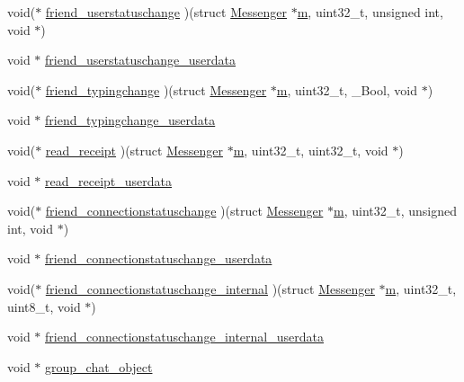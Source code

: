 \begin{DoxyCompactItemize}
\item 
void($\ast$ \hyperlink{struct_messenger_a61d62ee2f1f496b742acdcdf2c02f388}{friend\+\_\+userstatuschange} )(struct \hyperlink{struct_messenger}{Messenger} $\ast$\hyperlink{_messenger__test_8c_aea6eb6c7c30a659f1b0dee83eaf03ea2}{m}, uint32\+\_\+t, unsigned int, void $\ast$)
\item 
void $\ast$ \hyperlink{struct_messenger_a1007bf7131bf75ddd1980ed1b610e6f7}{friend\+\_\+userstatuschange\+\_\+userdata}
\item 
void($\ast$ \hyperlink{struct_messenger_a2d1cf25845a2a7d1b1f90916679fb4fe}{friend\+\_\+typingchange} )(struct \hyperlink{struct_messenger}{Messenger} $\ast$\hyperlink{_messenger__test_8c_aea6eb6c7c30a659f1b0dee83eaf03ea2}{m}, uint32\+\_\+t, \+\_\+\+Bool, void $\ast$)
\item 
void $\ast$ \hyperlink{struct_messenger_a597c89e529b39b6f08251d586c1379e7}{friend\+\_\+typingchange\+\_\+userdata}
\item 
void($\ast$ \hyperlink{struct_messenger_aa90ada8f04c210bdf2a6da03422ef96b}{read\+\_\+receipt} )(struct \hyperlink{struct_messenger}{Messenger} $\ast$\hyperlink{_messenger__test_8c_aea6eb6c7c30a659f1b0dee83eaf03ea2}{m}, uint32\+\_\+t, uint32\+\_\+t, void $\ast$)
\item 
void $\ast$ \hyperlink{struct_messenger_a82edcd1ba67ee440c38eb01b3003b900}{read\+\_\+receipt\+\_\+userdata}
\item 
void($\ast$ \hyperlink{struct_messenger_afb2bb77a40eb1445cc3e67cccc20a6ac}{friend\+\_\+connectionstatuschange} )(struct \hyperlink{struct_messenger}{Messenger} $\ast$\hyperlink{_messenger__test_8c_aea6eb6c7c30a659f1b0dee83eaf03ea2}{m}, uint32\+\_\+t, unsigned int, void $\ast$)
\item 
void $\ast$ \hyperlink{struct_messenger_a69af1b3dc5153b752781cf61ff660b89}{friend\+\_\+connectionstatuschange\+\_\+userdata}
\item 
void($\ast$ \hyperlink{struct_messenger_abfd5a34f887ae1fda52d86f4b01ea572}{friend\+\_\+connectionstatuschange\+\_\+internal} )(struct \hyperlink{struct_messenger}{Messenger} $\ast$\hyperlink{_messenger__test_8c_aea6eb6c7c30a659f1b0dee83eaf03ea2}{m}, uint32\+\_\+t, uint8\+\_\+t, void $\ast$)
\item 
void $\ast$ \hyperlink{struct_messenger_af915663b78a533e88c4f56cacbeeefdc}{friend\+\_\+connectionstatuschange\+\_\+internal\+\_\+userdata}
\item 
void $\ast$ \hyperlink{struct_messenger_accf717ba3e14c38e1611b17b78eed25c}{group\+\_\+chat\+\_\+object}
\item 

\end{DoxyCompactItemize}
